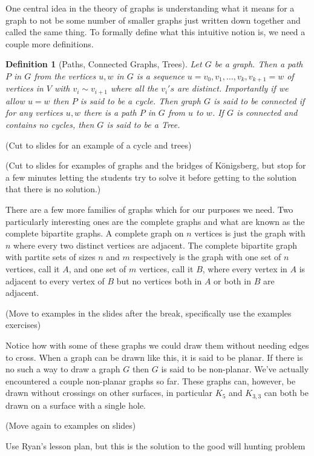 \documentclass[12pt]{article}
\newtheorem{definition}[theorem]{Definition}
\begin{document}
One central idea in the theory of graphs is understanding what it means for a graph to not be some number of smaller graphs just written down together and called the same thing. To formally define what this intuitive notion is, we need a couple more definitions. 
\begin{definition}[Paths, Connected Graphs, Trees]
	Let $G$ be a graph. Then a \emph{path} $P$ in $G$ from the vertices $u,w$ in $G$ is a sequence $u=v_0,v_1,\dots, v_k,v_{k+1}=w$ of vertices in $V$ with $v_i\sim v_{i+1}$ where all the $v_i's$ are distinct. Importantly if we allow $u=w$ then $P$ is said to be a cycle. Then graph $G$ is said to be connected if for any vertices $u,w$ there is a path $P$ in $G$ from $u$ to $w$. If $G$ is connected and contains no cycles, then $G$ is said to be a \emph{Tree}.
\end{definition}

(Cut to slides for an example of a cycle and trees)

(Cut to slides for examples of graphs and the bridges of K\"{o}nigsberg, but stop for a few minutes letting the students try to solve it before getting to the solution that there is no solution.)

There are a few more families of graphs which for our purposes we need. Two particularly interesting ones are the complete graphs and what are known as the complete bipartite graphs. A complete graph on $n$ vertices is just the graph with $n$ where every two distinct vertices are adjacent. The complete bipartite graph with partite sets of sizes $n$ and $m$ respectively is the graph with one set of $n$ vertices, call it $A$, and one set of $m$ vertices, call it $B$, where every vertex in $A$ is adjacent to every vertex of $B$ but no vertices both in $A$ or both in $B$ are adjacent.

(Move to examples in the slides after the break, specifically use the examples exercises) 

 Notice how with some of these graphs we could draw them without needing edges to cross. When a graph can be drawn like this, it is said to be planar. If there is no such a way to draw a graph $G$ then $G$ is said to be non-planar. We've actually encountered a couple non-planar graphs so far. These graphs can, however, be drawn without crossings on other surfaces, in particular $K_5$ and $K_{3,3}$ can both be drawn on a surface with a single hole.
 
 (Move again to examples on slides) 
 
 Use Ryan's lesson plan, but this is the solution to the good will hunting problem
 
\end{document}
